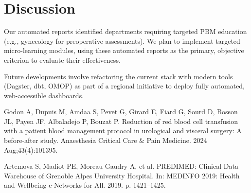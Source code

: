 \documentclass{IOS-Book-Article}
\begin{document}
\section{Discussion}

Our automated reports identified departments requiring targeted PBM education 
(e.g., gynecology for preoperative assessments). We plan to implement targeted micro-learning modules,
using these automated reports as the primary, objective criterion to evaluate their effectiveness.

Future developments involve refactoring the current stack with modern tools (Dagster, dbt, OMOP) as part of a regional 
initiative to deploy fully automated, web-accessible dashboards.

\begin{thebibliography}{99}

Godon A, Dupuis M, Amdaa S, Pevet G, Girard E, Fiard G, Sourd D, Bosson JL, Payen JF, Albaladejo P, Bouzat P. Reduction of red blood cell transfusion with a patient blood management protocol in urological and visceral surgery: A before-after study. Anaesthesia Critical Care \& Pain Medicine. 2024 Aug;43(4):101395.

Artemova S, Madiot PE, Moreau-Gaudry A, et al. PREDIMED: Clinical Data Warehouse of Grenoble Alpes University Hospital. In: MEDINFO 2019: Health and Wellbeing e-Networks for All. 2019. p. 1421--1425.

\end{thebibliography}
\end{document}
